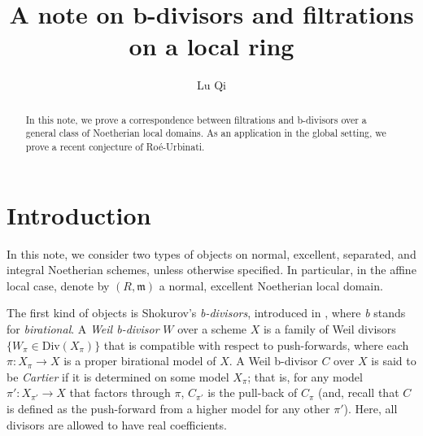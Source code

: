 \documentclass[11pt, leqno]{amsart}%
\theoremstyle{plain}
\theoremstyle{definition}
\theoremstyle{remark}
\newcommand{\fm}{\mathfrak{m}}
\newcommand{\Frac}{\mathrm{Frac}}
\newcommand{\Div}{\mathrm{Div}}
\begin{document}
	
    \title{A note on b-divisors and filtrations on a local ring}%
	
	
	
    \author{Lu Qi}%
    \address{School of Mathematical Sciences, East China Normal University, Shanghai 200241, China}
   
    

    \begin{abstract}
        In this note, we prove a correspondence between filtrations and b-divisors over a general class of Noetherian local domains. 
        As an application in the global setting, we prove a recent conjecture of Ro\'e-Urbinati.
    \end{abstract}

     
    \maketitle

\section{Introduction}

In this note, we consider two types of objects on normal, excellent, separated, and integral Noetherian schemes, unless otherwise specified. 
In particular, in the affine local case, denote by $(R,\fm)$ a normal, excellent Noetherian local domain.  %



\medskip

The first kind of objects is Shokurov's \emph{b-divisors}, introduced in \cite{Sho-b-div}, where \emph{b} stands for \emph{birational}. 
A \emph{Weil b-divisor} $W$ over a scheme $X$ is a family of Weil divisors $\{W_\pi\in\Div(X_\pi)\}$ that is compatible with respect to push-forwards, where each $\pi:X_\pi\to X$ is a proper birational model of $X$. 
A Weil b-divisor $C$ over $X$ is said to be \emph{Cartier} if it is determined on some model $X_\pi$; that is, for any model $\pi':X_{\pi'}\to X$ that factors through $\pi$, $C_{\pi'}$ is the pull-back of $C_\pi$ (and, recall that $C$ is defined as the push-forward from a higher model for any other $\pi'$). 
Here, all divisors are allowed to have real coefficients.
\end{document}
